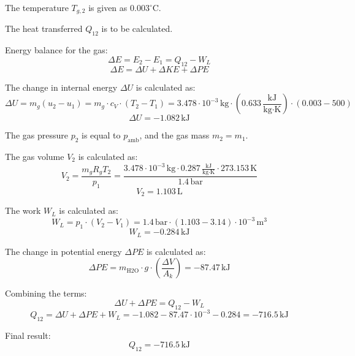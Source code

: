 The temperature \( T_{g,2} \) is given as \( 0.003^\circ\text{C} \).  

The heat transferred \( Q_{12} \) is to be calculated.  

Energy balance for the gas:  
\[
\Delta E = E_2 - E_1 = Q_{12} - W_{L}
\]  
\[
\Delta E = \Delta U + \Delta KE + \Delta PE
\]  

The change in internal energy \( \Delta U \) is calculated as:  
\[
\Delta U = m_g (u_2 - u_1) = m_g \cdot c_V \cdot (T_2 - T_1) = 3.478 \cdot 10^{-3} \, \text{kg} \cdot (0.633 \, \frac{\text{kJ}}{\text{kg·K}}) \cdot (0.003 - 500)
\]  
\[
\Delta U = -1.082 \, \text{kJ}
\]  

The gas pressure \( p_2 \) is equal to \( p_{\text{amb}} \), and the gas mass \( m_2 = m_1 \).  

The gas volume \( V_2 \) is calculated as:  
\[
V_2 = \frac{m_g R_g T_2}{p_1} = \frac{3.478 \cdot 10^{-3} \, \text{kg} \cdot 0.287 \, \frac{\text{kJ}}{\text{kg·K}} \cdot 273.153 \, \text{K}}{1.4 \, \text{bar}}
\]  
\[
V_2 = 1.103 \, \text{L}
\]  

The work \( W_{L} \) is calculated as:  
\[
W_{L} = p_1 \cdot (V_2 - V_1) = 1.4 \, \text{bar} \cdot (1.103 - 3.14) \cdot 10^{-3} \, \text{m}^3
\]  
\[
W_{L} = -0.284 \, \text{kJ}
\]  

The change in potential energy \( \Delta PE \) is calculated as:  
\[
\Delta PE = m_{\text{H2O}} \cdot g \cdot \left( \frac{\Delta V}{A_k} \right) = -87.47 \, \text{kJ}
\]  

Combining the terms:  
\[
\Delta U + \Delta PE = Q_{12} - W_{L}
\]  
\[
Q_{12} = \Delta U + \Delta PE + W_{L} = -1.082 - 87.47 \cdot 10^{-3} - 0.284 = -716.5 \, \text{kJ}
\]  

Final result:  
\[
Q_{12} = -716.5 \, \text{kJ}
\]